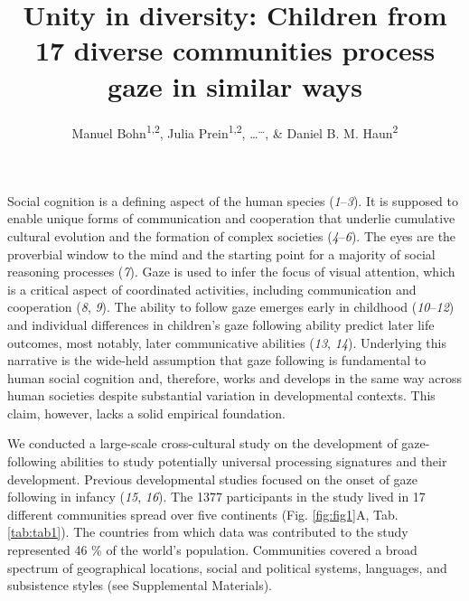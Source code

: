 \documentclass[
  man,floatsintext]{apa6}
\title{Unity in diversity: Children from 17 diverse communities process gaze in similar ways}
\author{Manuel Bohn\textsuperscript{1,2}, Julia Prein\textsuperscript{1,2}, \ldots{}\textsuperscript{\ldots{}}, \& Daniel B. M. Haun\textsuperscript{2}}
\date{}
\affiliation{\vspace{0.5cm}\textsuperscript{1} Institute of Psychology in Education, Leuphana University Lüneburg\\\textsuperscript{2} Department of Comparative Cultural Psychology, Max Planck Institute for Evolutionary Anthropology}
\begin{document}
\maketitle

Social cognition is a defining aspect of the human species (\emph{1}--\emph{3}). It is supposed to enable unique forms of communication and cooperation that underlie cumulative cultural evolution and the formation of complex societies (\emph{4}--\emph{6}). The eyes are the proverbial window to the mind and the starting point for a majority of social reasoning processes (\emph{7}). Gaze is used to infer the focus of visual attention, which is a critical aspect of coordinated activities, including communication and cooperation (\emph{8}, \emph{9}). The ability to follow gaze emerges early in childhood (\emph{10}--\emph{12}) and individual differences in children's gaze following ability predict later life outcomes, most notably, later communicative abilities (\emph{13}, \emph{14}). Underlying this narrative is the wide-held assumption that gaze following is fundamental to human social cognition and, therefore, works and develops in the same way across human societies despite substantial variation in developmental contexts. This claim, however, lacks a solid empirical foundation.

We conducted a large-scale cross-cultural study on the development of gaze-following abilities to study potentially universal processing signatures and their development. Previous developmental studies focused on the onset of gaze following in infancy (\emph{15}, \emph{16}). The 1377 participants in the study lived in 17 different communities spread over five continents (Fig. \ref{fig:fig1}A, Tab. \ref{tab:tab1}). The countries from which data was contributed to the study represented 46 \% of the world's population. Communities covered a broad spectrum of geographical locations, social and political systems, languages, and subsistence styles (see Supplemental Materials).
\end{document}
